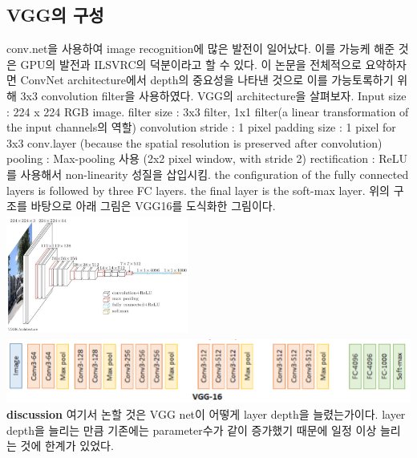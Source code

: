 \documentclass[extendedabs]{bmvc2k}
\begin{document}
 \subsection{VGG의 구성}
 conv.net을 사용하여 image recognition에 많은 발전이 일어났다. 이를 가능케 해준 것은 GPU의 발전과 ILSVRC의 덕분이라고 할 수 있다.
 이 논문을 전체적으로 요약하자면 ConvNet architecture에서 depth의 중요성을 나타낸 것으로 이를 가능토록하기 위해 3x3 convolution filter을 사용하였다.
 VGG의 architecture을 살펴보자.
 \newline Input size : 224 x 224 RGB image.
 \newline filter size : 3x3 filter, 1x1 filter(a linear transformation of the input channels의 역할)
 \newline convolution stride : 1 pixel
 \newline padding size : 1 pixel for 3x3 conv.layer (because the spatial resolution is preserved after convolution)
 \newline pooling : Max-pooling 사용 (2x2 pixel window, with stride 2)
 \newline rectification : ReLU 를 사용해서 non-linearity 성질을 삽입시킴.
 \newline the configuration of the fully connected layers is followed by three FC layers.
 \newline the final layer is the soft-max layer.
 \newline 위의 구조를 바탕으로 아래 그림은 VGG16를 도식화한 그림이다.
 \newline  \includegraphics[width=6cm, height=4cm]{images/01_VGG.png}
 \newline  \includegraphics[width=\linewidth]{images/02_VGG.png}
 \newline  \textbf{discussion} 여기서 논할 것은 VGG net이 어떻게 layer depth을 늘렸는가이다. 
 layer depth을 늘리는 만큼 기존에는 parameter수가 같이 증가했기 때문에 일정 이상 늘리는 것에 한계가 있었다.
\end{document}
